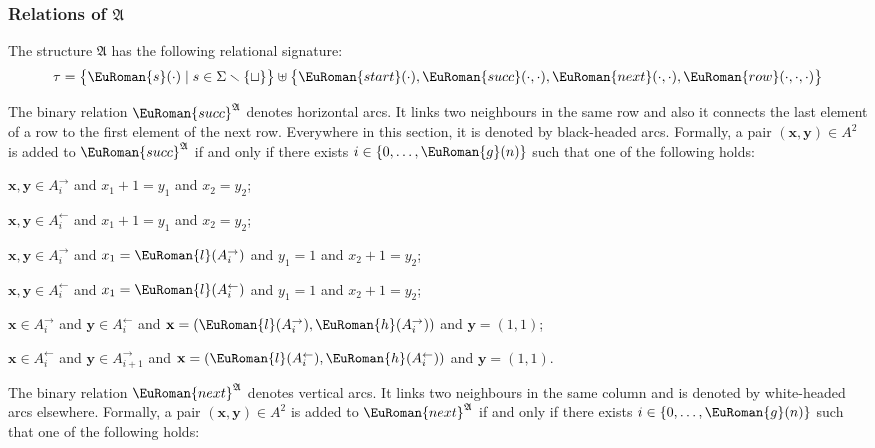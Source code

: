 \documentclass[10pt,a4paper]{amsart}
\theoremstyle{plain}
\theoremstyle{definition}
\numberwithin{equation}{section}
\newcommand{\eurm}[1]{\EuRoman{#1}} %
\newcommand{\structure}[1]{\mathfrak{#1}} %
\newcommand{\tuple}[1]{\mathbf{#1}} %
\newcommand{\rel}[1]{\eurm{#1}} %
\newcommand{\func}[1]{\eurm{#1}}  %
\renewcommand{\setminus}{\smallsetminus}
\begin{document}
\subsubsection*{Relations of $\structure{A}$}
The structure $\structure{A}$ has the following relational signature:
\begin{equation*}
\tau = \bigl\{\rel{s}(\cdot)\mid s\in\Sigma\setminus\{\sqcup\}\bigr\}\uplus\bigl\{\rel{start}(\cdot), \rel{succ}(\cdot,\cdot), \rel{next}(\cdot,\cdot),\rel{row}(\cdot,\cdot,\cdot)\bigr\}
\end{equation*}
\begin{compactitem}
\item The binary relation $\rel{succ}^\structure{A}$ denotes horizontal arcs.
It links two neighbours in the same row and also it connects the last element of a row to the first element of the next row. 
Everywhere in this section, it is denoted by black-headed arcs.
Formally, a pair $(\tuple{x},\tuple{y})\in A^2$ is added to $\rel{succ}^\structure{A}$ if and only if there exists $i\in\{0,\ldots,\func{g}(n)\}$ such that one of the following holds:
\begin{compactitem}
\item $\tuple{x},\tuple{y}\in A_i^\rightarrow$ and $x_1+1=y_1$ and $x_2=y_2$;
\item $\tuple{x},\tuple{y}\in A_i^\leftarrow$ and $x_1+1=y_1$ and $x_2=y_2$;
\item $\tuple{x},\tuple{y}\in A_i^\rightarrow$ and $x_1=\func{l}(A_i^\rightarrow)$ and $y_1=1$ and $x_2+1=y_2$;
\item $\tuple{x},\tuple{y}\in A_i^\leftarrow$ and $x_1=\func{l}(A_i^\leftarrow)$ and $y_1=1$ and $x_2+1=y_2$;
\item $\tuple{x}\in A_i^\rightarrow$ and $\tuple{y}\in A_i^\leftarrow$ and $\tuple{x} = (\func{l}(A_i^\rightarrow), \func{h}(A_i^\rightarrow))$ and $\tuple{y} = (1, 1)$;
\item $\tuple{x}\in A_i^\leftarrow$ and $\tuple{y}\in A_{i+1}^\rightarrow$ and $\tuple{x} = (\func{l}(A_i^\leftarrow), \func{h}(A_i^\leftarrow))$ and $\tuple{y} = (1, 1)$.
\end{compactitem}
\item The binary relation $\rel{next}^\structure{A}$ denotes vertical arcs.
It links two neighbours in the same column and is denoted by white-headed arcs elsewhere.
Formally, a pair $(\tuple{x},\tuple{y})\in A^2$ is added to $\rel{next}^\structure{A}$ if and only if there exists $i\in\{0,\ldots,\func{g}(n)\}$ such that one of the following holds:
\begin{compactitem}

\end{compactitem}
\end{compactitem}
\end{document}
